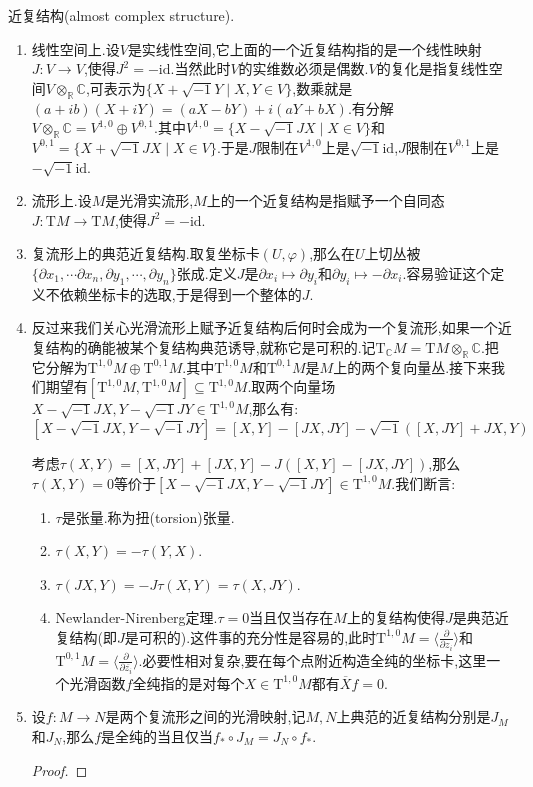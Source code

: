 近复结构(almost complex structure).
\begin{enumerate}
	\item 线性空间上.设$V$是实线性空间,它上面的一个近复结构指的是一个线性映射$J:V\to V$,使得$J^2=-\mathrm{id}$.当然此时$V$的实维数必须是偶数.$V$的复化是指复线性空间$V\otimes_{\mathbb{R}}\mathbb{C}$,可表示为$\{X+\sqrt{-1}Y\mid X,Y\in V\}$,数乘就是$(a+ib)(X+iY)=(aX-bY)+i(aY+bX)$.有分解$V\otimes_{\mathbb{R}}\mathbb{C}=V^{1,0}\oplus V^{0,1}$.其中$V^{1,0}=\{X-\sqrt{-1}JX\mid X\in V\}$和$V^{0,1}=\{X+\sqrt{-1}JX\mid X\in V\}$.于是$J$限制在$V^{1,0}$上是$\sqrt{-1}\mathrm{id}$,$J$限制在$V^{0,1}$上是$-\sqrt{-1}\mathrm{id}$.
	\item 流形上.设$M$是光滑实流形,$M$上的一个近复结构是指赋予一个自同态$J:\mathrm{T}M\to\mathrm{T}M$,使得$J^2=-\mathrm{id}$.
	\item 复流形上的典范近复结构.取复坐标卡$(U,\varphi)$,那么在$U$上切丛被$\{\partial x_1,\cdots\partial x_n,\partial y_1,\cdots,\partial y_n\}$张成.定义$J$是$\partial x_i\mapsto\partial y_i$和$\partial y_i\mapsto-\partial x_i$.容易验证这个定义不依赖坐标卡的选取,于是得到一个整体的$J$.
	\item 反过来我们关心光滑流形上赋予近复结构后何时会成为一个复流形,如果一个近复结构的确能被某个复结构典范诱导,就称它是可积的.记$\mathrm{T}_{\mathbb{C}}M=\mathrm{T}M\otimes_{\mathbb{R}}\mathbb{C}$.把它分解为$\mathrm{T}^{1,0}M\oplus\mathrm{T}^{0,1}M$.其中$\mathrm{T}^{1,0}M$和$\mathrm{T}^{0,1}M$是$M$上的两个复向量丛.接下来我们期望有$[\mathrm{T}^{1,0}M,\mathrm{T}^{1,0}M]\subseteq\mathrm{T}^{1,0}M$.取两个向量场$X-\sqrt{-1}JX,Y-\sqrt{-1}JY\in\mathrm{T}^{1,0}M$,那么有:
	$$[X-\sqrt{-1}JX,Y-\sqrt{-1}JY]=[X,Y]-[JX,JY]-\sqrt{-1}\left([X,JY]+JX,Y\right)$$
	
	考虑$\tau(X,Y)=[X,JY]+[JX,Y]-J\left([X,Y]-[JX,JY]\right)$,那么$\tau(X,Y)=0$等价于$[X-\sqrt{-1}JX,Y-\sqrt{-1}JY]\in\mathrm{T}^{1,0}M$.我们断言:
	\begin{enumerate}
		\item $\tau$是张量.称为扭(torsion)张量.
		\item $\tau(X,Y)=-\tau(Y,X)$.
		\item $\tau(JX,Y)=-J\tau(X,Y)=\tau(X,JY)$.
		\item Newlander-Nirenberg定理.$\tau=0$当且仅当存在$M$上的复结构使得$J$是典范近复结构(即$J$是可积的).这件事的充分性是容易的,此时$\mathrm{T}^{1,0}M=\langle\frac{\partial}{\partial z_i}\rangle$和$\mathrm{T}^{0,1}M=\langle\frac{\partial}{\partial\overline{z_i}}\rangle$.必要性相对复杂,要在每个点附近构造全纯的坐标卡,这里一个光滑函数$f$全纯指的是对每个$X\in\mathrm{T}^{1,0}M$都有$\overline{X}f=0$.
	\end{enumerate}
    \item 设$f:M\to N$是两个复流形之间的光滑映射,记$M,N$上典范的近复结构分别是$J_M$和$J_N$,那么$f$是全纯的当且仅当$f_*\circ J_M=J_N\circ f_*$.
    \begin{proof}
    	

\end{proof}
\end{enumerate}
